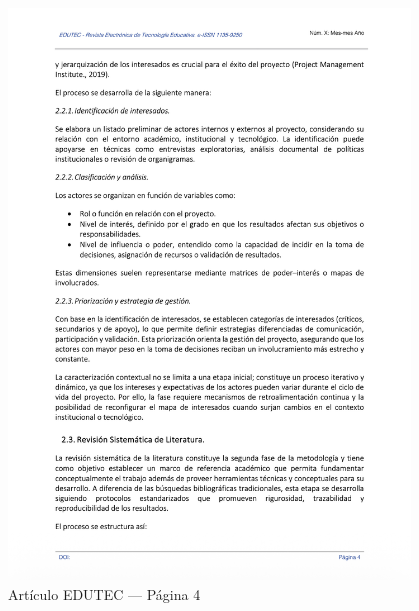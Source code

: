 \begin{figure}[H]
    \centering
    \begin{tcolorbox}[
        colback=white,
        colframe=gray!50,
        boxrule=1pt,
        arc=2pt,
        boxsep=5pt,
        left=3pt,
        right=3pt,
        top=3pt,
        bottom=3pt,
        drop shadow
    ]
        \includegraphics[width=0.95\textwidth,keepaspectratio]{apendices/EDUTEC/4.png}
    \end{tcolorbox}
    \caption{Artículo EDUTEC --- Página 4}\label{fig:edutec-pagina-4}
\end{figure}
\FloatBarrier

